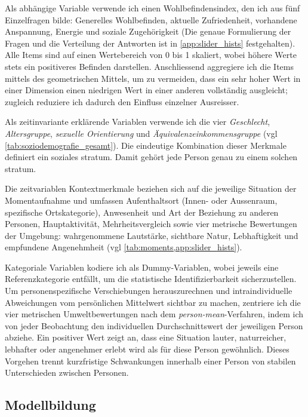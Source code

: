 Als abhängige Variable verwende ich einen Wohlbefindensindex, den ich aus fünf Einzelfragen bilde: Generelles Wohlbefinden, aktuelle Zufriedenheit, vorhandene Anspannung, Energie und soziale Zugehörigkeit (Die genaue Formulierung der Fragen und die Verteilung der Antworten ist in \cref{app:slider_hists} festgehalten). Alle Items sind auf einen Wertebereich von 0 bis 1 skaliert, wobei höhere Werte stets ein positiveres Befinden darstellen. Anschliessend aggregiere ich die Items mittels des geometrischen Mittels, um zu vermeiden, dass ein sehr hoher Wert in einer Dimension einen niedrigen Wert in einer anderen vollständig ausgleicht; zugleich reduziere ich dadurch den Einfluss einzelner Ausreisser.

Als zeitinvariante erklärende Variablen verwende ich die vier  \emph{Geschlecht}, \emph{Altersgruppe}, \emph{sexuelle Orientierung} und \emph{Äquivalenzeinkommensgruppe} (\gls{vgl} \cref{tab:soziodemografie_gesamt}). Die eindeutige Kombination dieser Merkmale definiert ein soziales \gls{stratum}. Damit gehört jede Person genau zu einem solchen \gls{stratum}.

Die zeitvariablen Kontextmerkmale beziehen sich auf die jeweilige Situation der Momentaufnahme und umfassen Aufenthaltsort (Innen- oder Aussenraum, spezifische Ortskategorie), Anwesenheit und Art der Beziehung zu anderen Personen, Hauptaktivität, Mehrheitsvergleich sowie vier metrische Bewertungen der Umgebung: wahrgenommene Lautstärke, sichtbare Natur, Lebhaftigkeit und empfundene Angenehmheit (\gls{vgl} \cref{tab:moments,app:slider_hists}).

Kategoriale Variablen kodiere ich als Dummy-Variablen, wobei jeweils eine Referenzkategorie entfällt, um die statistische Identifizierbarkeit sicherzustellen. Um personenspezifische Verschiebungen herauszurechnen und intraindividuelle Abweichungen vom persönlichen Mittelwert sichtbar zu machen, zentriere ich die vier metrischen Umweltbewertungen nach dem \emph{person-mean}-Verfahren, indem ich von jeder Beobachtung den individuellen Durchschnittswert der jeweiligen Person abziehe. Ein positiver Wert zeigt an, dass eine Situation lauter, naturreicher, lebhafter oder angenehmer erlebt wird als für diese Person gewöhnlich. Dieses Vorgehen trennt kurzfristige Schwankungen innerhalb einer Person von stabilen Unterschieden zwischen Personen.

\subsection*{Modellbildung}

